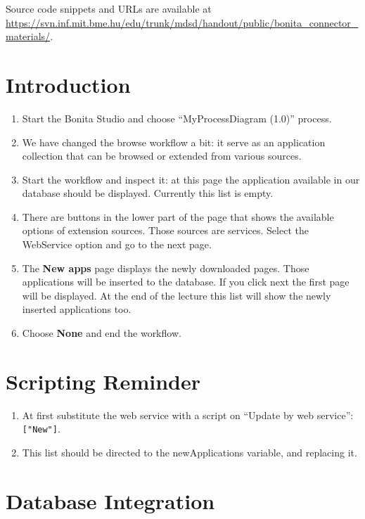 \documentclass[]{report}
\begin{document}
Source code snippets and URLs are available at
\url{https://svn.inf.mit.bme.hu/edu/trunk/mdsd/handout/public/bonita_connector_materials/}.

\section{Introduction}

\begin{enumerate}
\def\labelenumi{\arabic{enumi}.}
\item
  Start the Bonita Studio and choose ``MyProcessDiagram (1.0)'' process.
\item
  We have changed the browse workflow a bit: it serve as an application
  collection that can be browsed or extended from various sources.
\item
  Start the workflow and inspect it: at this page the application
  available in our database should be displayed. Currently this list is
  empty.
\item
  There are buttons in the lower part of the page that shows the
  available options of extension sources. Those sources are services.
  Select the WebService option and go to the next page.
\item
  The \textbf{New apps} page displays the newly downloaded pages. Those
  applications will be inserted to the database. If you click next the
  first page will be displayed. At the end of the lecture this list will
  show the newly inserted applications too.
\item
  Choose \textbf{None} and end the workflow.
\end{enumerate}

\section{Scripting Reminder}

\begin{enumerate}
\def\labelenumi{\arabic{enumi}.}
\item
  At first substitute the web service with a script on ``Update by web
  service'': \texttt{{[}"New"{]}}.
\item
  This list should be directed to the newApplications variable, and
  replacing it.
\end{enumerate}

\section{Database Integration}
\end{document}
